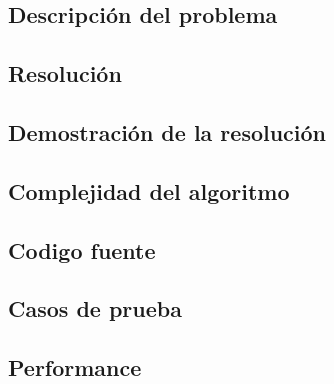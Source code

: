 \subsection{Descripci\'on del problema}


\subsection{Resoluci\'on}


\subsection{Demostraci\'on de la resoluci\'on}


\subsection{Complejidad del algoritmo}


\subsection{Codigo fuente}




\subsection{Casos de prueba}

\subsection{Performance}
